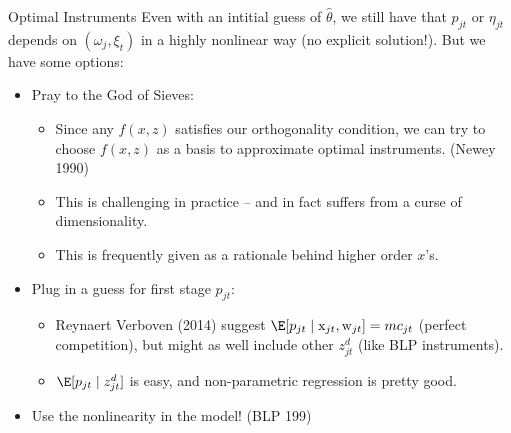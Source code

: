 \begin{frame}{Optimal Instruments}
Even with an intitial guess of $\widehat{\theta}$, we still have that $p_{jt}$ or $\eta_{jt}$ depends on $(\omega_{j},\xi_{t})$ in a highly nonlinear way (no explicit solution!). But we have some options:
\begin{itemize}
\item Pray to the God of Sieves:
\begin{itemize}
\item Since any $f(x,z)$ satisfies our orthogonality condition, we can try to choose $f(x,z)$ as a \alert{basis} to approximate optimal instruments. (Newey 1990)
\item This is challenging in practice -- and in fact suffers from a curse of dimensionality.
\item This is frequently given as a rationale behind higher order $x$'s.
\end{itemize}
\item Plug in a guess for \alert{first stage} $p_{jt}$:
\begin{itemize}
\item Reynaert Verboven (2014) suggest $\E[p_{jt} \mid \mathrm{x}_{jt}, \mathrm{w}_{jt}]=mc_{jt}$ (perfect competition), but might as well include other $z_{jt}^d$ (like BLP instruments).
\item $\E[p_{jt} \mid z_{jt}^d]$ is easy, and non-parametric regression is pretty good.
\end{itemize}
\item Use the nonlinearity in the model! (BLP 199)
\end{itemize}
\end{frame}




